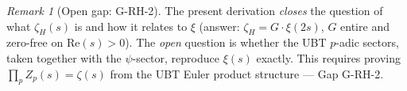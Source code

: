 \documentclass[11pt,a4paper]{article}
\theoremstyle{definition}
\theoremstyle{remark}
\newtheorem{remark}[theorem]{Remark}
\begin{document}
\begin{remark}[Open gap: G-RH-2]
The present derivation \emph{closes} the question of what $\zeta_H(s)$
is and how it relates to $\xi$ (answer: $\zeta_H = G\cdot\xi(2s)$,
$G$ entire and zero-free on $\mathrm{Re}(s)>0$).
The \emph{open} question is whether the UBT $p$-adic sectors, taken
together with the $\psi$-sector, reproduce $\xi(s)$ exactly.
This requires proving $\prod_p Z_p(s) = \zeta(s)$
from the UBT Euler product structure — Gap G-RH-2.
\end{remark}
\end{document}
